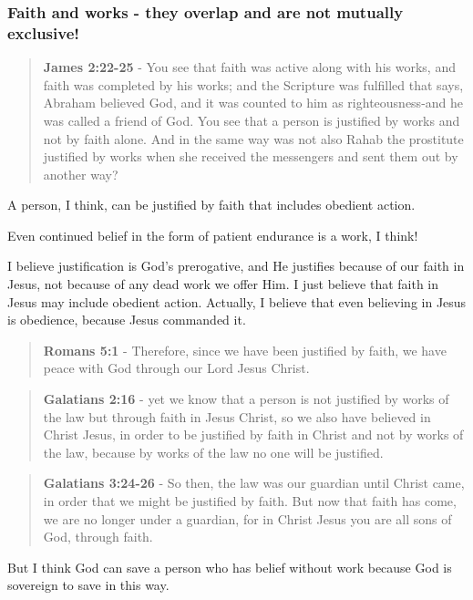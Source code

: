 \documentclass[11pt]{article}
\begin{document}
\subsubsection{Faith and works - they overlap and are \textbf{not} mutually exclusive!}
\label{sec:org833fcd7}
\begin{quote}
\textbf{James 2:22-25} - You see that faith was active along with his works, and faith was completed by his works; and the Scripture was fulfilled that says, Abraham believed God, and it was counted to him as righteousness-and he was called a friend of God. You see that a person is justified by works and not by faith alone. And in the same way was not also Rahab the prostitute justified by works when she received the messengers and sent them out by another way?
\end{quote}

A person, I think, can be justified by faith that includes obedient action.

Even continued belief in the form of patient endurance is a work, I think!

I believe justification is God's prerogative, and He justifies because of our faith in Jesus, not because of any dead work we offer Him. I just believe that faith in Jesus may include obedient action.
Actually, I believe that even believing in Jesus is obedience, because Jesus commanded it.

\begin{quote}
\textbf{Romans 5:1} - Therefore, since we have been justified by faith, we have peace with God through our Lord Jesus Christ.
\end{quote}

\begin{quote}
\textbf{Galatians 2:16} - yet we know that a person is not justified by works of the law but through faith in Jesus Christ, so we also have believed in Christ Jesus, in order to be justified by faith in Christ and not by works of the law, because by works of the law no one will be justified.
\end{quote}

\begin{quote}
\textbf{Galatians 3:24-26} - So then, the law was our guardian until Christ came, in order that we might be justified by faith. But now that faith has come, we are no longer under a guardian, for in Christ Jesus you are all sons of God, through faith.
\end{quote}

But I think God can save a person who has belief without work because God is sovereign to save in this way.
\end{document}
